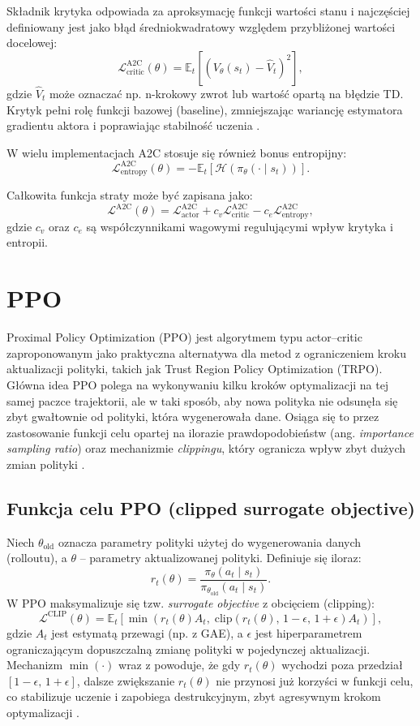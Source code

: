 Składnik krytyka odpowiada za aproksymację funkcji wartości stanu i najczęściej definiowany jest
jako błąd średniokwadratowy względem przybliżonej wartości docelowej:
\[
\mathcal{L}^{\text{A2C}}_{\text{critic}}(\theta)
= \mathbb{E}_t \left[ \left( V_\theta(s_t) - \hat{V}_t \right)^2 \right],
\]
gdzie $\hat{V}_t$ może oznaczać np. n-krokowy zwrot lub wartość opartą na błędzie TD.
Krytyk pełni rolę funkcji bazowej (baseline), zmniejszając wariancję estymatora gradientu aktora
i poprawiając stabilność uczenia \cite{mnih2016}.

W wielu implementacjach A2C stosuje się również bonus entropijny:
\[
\mathcal{L}^{\text{A2C}}_{\text{entropy}}(\theta)
= - \mathbb{E}_t \left[ \mathcal{H}(\pi_\theta(\cdot \mid s_t)) \right].
\]

Całkowita funkcja straty może być zapisana jako:
\[
\mathcal{L}^{\text{A2C}}(\theta)
= \mathcal{L}^{\text{A2C}}_{\text{actor}}
+ c_v \mathcal{L}^{\text{A2C}}_{\text{critic}}
- c_e \mathcal{L}^{\text{A2C}}_{\text{entropy}},
\]
gdzie $c_v$ oraz $c_e$ są współczynnikami wagowymi regulującymi wpływ krytyka i entropii.

\section{PPO}

Proximal Policy Optimization (PPO) jest algorytmem typu actor--critic zaproponowanym jako
praktyczna alternatywa dla metod z ograniczeniem kroku aktualizacji polityki, takich jak Trust Region Policy Optimization (TRPO).
Główna idea PPO polega na wykonywaniu kilku kroków optymalizacji na tej samej paczce trajektorii,
ale w taki sposób, aby nowa polityka nie odsunęła się zbyt gwałtownie od polityki, która wygenerowała dane.
Osiąga się to przez zastosowanie funkcji celu opartej na ilorazie prawdopodobieństw (ang. \textit{importance sampling ratio})
oraz mechanizmie \emph{clippingu}, który ogranicza wpływ zbyt dużych zmian polityki \cite{Schulman2017PPO,Schulman2015TRPO}.

\subsection*{Funkcja celu PPO (clipped surrogate objective)}

Niech $\theta_{\text{old}}$ oznacza parametry polityki użytej do wygenerowania danych (rolloutu),
a $\theta$ -- parametry aktualizowanej polityki. Definiuje się iloraz:
\[
r_t(\theta) =
\frac{\pi_\theta(a_t \mid s_t)}{\pi_{\theta_{\text{old}}}(a_t \mid s_t)}.
\]
W PPO maksymalizuje się tzw. \emph{surrogate objective} z obcięciem (clipping):
\[
\mathcal{L}^{\text{CLIP}}(\theta)
=
\mathbb{E}_t\left[
\min\left(
r_t(\theta) A_t,\;
\text{clip}\left(r_t(\theta),\, 1-\epsilon,\, 1+\epsilon\right) A_t
\right)\right],
\]
gdzie $A_t$ jest estymatą przewagi (np. z GAE), a $\epsilon$ jest hiperparametrem
ograniczającym dopuszczalną zmianę polityki w pojedynczej aktualizacji.
Mechanizm $\min(\cdot)$ wraz z  powoduje, że gdy $r_t(\theta)$ wychodzi poza przedział
$[1-\epsilon,\,1+\epsilon]$, dalsze zwiększanie $r_t(\theta)$ nie przynosi już korzyści w funkcji celu,
co stabilizuje uczenie i zapobiega destrukcyjnym, zbyt agresywnym krokom optymalizacji \cite{Schulman2017PPO}.

